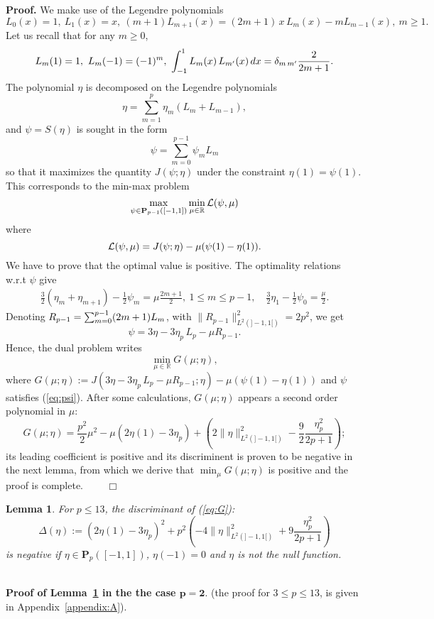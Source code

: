 \documentclass[final]{siamltex}
\newtheorem{lem}{Lemma}
\begin{document}
{\bf Proof.} We make use of the Legendre polynomials
\[
L_0(x)=1,\ L_1(x)=x,\ (m+1)L_{m+1}(x)=(2m+1)\,x\,L_m(x) - mL_{m-1}(x),\ m\ge 1.
\]
Let us recall that for any $m\ge 0$,
\[
L_m(1)=1,\ L_m(-1)=(-1)^m, \
\int_{-1}^1 L_m(x)\,L_{m'}(x)\,dx = \delta_{m\,m'}{\displaystyle}\frac{2}{2m+1}.
\]
The polynomial $\eta$ is decomposed on the Legendre polynomials
\[
\eta=\sum_{m=1}^p \eta_m(L_m+L_{m-1}),
\]
and $\psi=S(\eta)$ is sought in the form
\[
\psi=\sum_{m=0}^{p-1} \psi_m L_m
\]
so that it maximizes the quantity $J(\psi;\eta)$ under the constraint
$\eta(1)=\psi(1)$. This corresponds to the min-max problem
\[
\max_{\psi\in{\mathbf{P}}_{p-1}([-1,1])}\min_{\mu\in{{\mathbb R}}} {\cal L}(\psi,\mu)
\]
where
\[
{\cal L}(\psi,\mu) = J(\psi;\eta)-\mu (\psi(1)-\eta(1)).
\]
We have to prove that the optimal value is positive. The optimality
relations w.r.t
$\psi$ give
\begin{eqnarray*}
\frac{3}{2}(\eta_m+\eta_{m+1})-\frac{1}{2}\psi_m=\mu \frac{2m+1}{2},\
1\le m\le p-1,\quad 
\frac{3}{2}\eta_1-\frac{1}{2}\psi_0=\frac{\mu}{2}.
\end{eqnarray*}
Denoting ${\displaystyle} R_{p-1}=\sum_{m=0}^{p-1}(2m+1)L_m$, with
$\|R_{p-1}\|_{L^2(]-1,1[)}^2=2p^2$, we get
\begin{equation}\label{eq:psi}
\psi = 3\eta -3\eta_p\,L_p - \mu R_{p-1}.
\end{equation}
Hence, the dual problem writes
\[
\min_{\mu\in{{\mathbb R}}} G(\mu;\eta),
\]
where
$ G(\mu;\eta) := J(3\eta -3\eta_p\,L_p - \mu
R_{p-1};\eta)-\mu(\psi(1)-\eta(1)) $
and $\psi$ satisfies (\ref{eq:psi}).
After some calculations, $G(\mu;\eta) $ appears a second order polynomial in $\mu$:
\begin{equation}\label{eq:G}
G(\mu;\eta) = \frac{p^2}{2} \mu^2 -\mu (2\eta(1)-3\eta_p)
+(2\|\eta\|_{L^2(]-1,1[)}^2-\frac{9}{2}\frac{\eta_p^2}{2p+1});
\end{equation}
its leading coefficient 
 is positive and its discriminent is proven to be negative in the next lemma, from which we derive that
$\min_\mu G(\mu;\eta)$ is positive and the proof is complete. $\qquad \Box$

\begin{lem}\label{lem:Delta}
For $p\le 13$, the discriminant of (\ref{eq:G}):
\begin{equation*}\label{eq:discr}
\Delta(\eta) := (2\eta(1)-3\eta_p)^2 +
p^2 (-4\|\eta\|_{L^2(]-1,1[)}^2 + 9\frac{\eta_p^2}{2p+1})
\end{equation*}
  is negative if $\eta\in{\mathbf{P}}_p([-1,1])$, $\eta(-1)=0$ and $\eta$ is not
the null function.
\end{lem}
\noindent\\[3mm]
{\bf Proof of Lemma~\ref{lem:Delta} in the the case $\pmb{p=2}$}. (the proof  for $3\le p\le 13$,
  is given in Appendix~\ref{appendix:A}).
  
\end{document}
